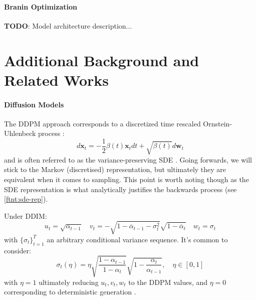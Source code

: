 \paragraph{Branin Optimization} \textbf{TODO}: Model architecture description...

\newpage

\section{Additional Background and Related Works} \label{sec:extra}

\paragraph{Diffusion Models}

\begin{remark} \label{rem:sde-rep}
    The DDPM approach corresponds to a discretized time rescaled Ornstein-Uhlenbeck process
    \parencite{boysTweedieMomentProjected2023,songScoreBasedGenerativeModeling2021}:
    $$
    d\mathbf{x}_t = -\frac{1}{2}\beta(t)\mathbf{x}_t dt + \sqrt{\beta(t)}d\mathbf{w}_t
    $$
    and is often referred to as the variance-preserving SDE
    \parencite{songScoreBasedGenerativeModeling2021}. Going forwards, we will stick to the Markov
    (discretised) representation, but ultimately they are equivalent when it comes to sampling.
    This point is worth noting though as the SDE representation is what analytically justifies the
    backwards process (see \autoref{ftnt:sde-rep}).
\end{remark}

\begin{remark} \label{rem:ddim}
    Under DDIM:
    \begin{equation*}
        u_t = \sqrt{\alpha_{t-1}} \quad
        v_t = -\sqrt{1 - \overline{\alpha}_{t-1} - \sigma_t^2}\sqrt{1 - \overline{\alpha}_t} \quad
        w_t = \sigma_t
    \end{equation*}
    with $\{\sigma_t\}_{t=1}^T$ an arbitrary conditional variance sequence. It's common to consider:
    \begin{equation*}
        \sigma_t(\eta) = \eta\sqrt{\frac{1 - \alpha_{t-1}}{1 - \alpha_t}}\sqrt{1 - \frac{\alpha_t}{\alpha_{t-1}}},\quad \eta \in [0,1]
    \end{equation*}
    with $\eta=1$ ultimately reducing $u_t, v_t, w_t$ to the DDPM values, and $\eta=0$ corresponding
    to deterministic generation \parencite{songDenoisingDiffusionImplicit2020}.
\end{remark}

